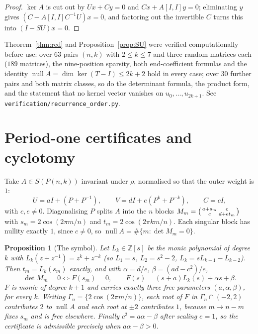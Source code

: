 \documentclass[11pt]{article}
\newtheorem{proposition}[theorem]{Proposition}
\theoremstyle{definition}
\begin{document}
\begin{proof}
$\ker A$ is cut out by $Ux+Cy=0$ and $Cx+A[I,I]y=0$; eliminating $y$ gives
$(C-A[I,I]C^{-1}U)x=0$, and factoring out the invertible $C$ turns this into
$(I-SU)x=0$.
\end{proof}

\noindent
Theorem~\ref{thm:red} and Proposition~\ref{prop:SU} were verified
computationally before use: over $63$ pairs $(n,k)$ with $2\le k\le7$ and
three random matrices each ($189$ matrices), the nine-position sparsity, both
end-coefficient formulas and the identity
$\operatorname{null}A=\dim\ker(T-I)\le 2k+2$ hold in every case; over $30$
further pairs and both matrix classes, so do the determinant formula, the
product form, and the statement that no kernel vector vanishes on
$u_0,\dots,u_{2k+1}$. See \texttt{verification/recurrence\_order.py}.

\section{Period-one certificates and cyclotomy}\label{sec:cyclo}
Take $A\in S(P(n,k))$ invariant under $\rho$, normalised so that the outer
weight is $1$:
\[
  U=aI+(P+P^{-1}),\qquad V=dI+e(P^{k}+P^{-k}),\qquad C=cI,
\]
with $c,e\ne0$. Diagonalising $P$ splits $A$ into the $n$ blocks
$M_m=\begin{psmallmatrix}a+s_m&c\\ c&d+et_m\end{psmallmatrix}$ with
$s_m=2\cos(2\pi m/n)$ and $t_m=2\cos(2\pi km/n)$. Each singular block has
nullity exactly $1$, since $c\ne0$, so
$\operatorname{null}A=\#\{m: \det M_m=0\}$.

\begin{proposition}[The symbol]\label{prop:symbol}
Let $L_k\in\mathbb Z[s]$ be the monic polynomial of degree $k$ with
$L_k(z+z^{-1})=z^{k}+z^{-k}$ (so $L_1=s$, $L_2=s^2-2$,
$L_k=sL_{k-1}-L_{k-2}$). Then $t_m=L_k(s_m)$ exactly, and with
$\alpha=d/e$, $\beta=(ad-c^{2})/e$,
\[
  \det M_m=0\iff F(s_m)=0,\qquad
  F(s)=(s+a)L_k(s)+\alpha s+\beta .
\]
$F$ is monic of degree $k+1$ and carries exactly three free parameters
$(a,\alpha,\beta)$, for every $k$. Writing
$\Gamma_n=\{2\cos(2\pi m/n)\}$, each root of $F$ in
$\Gamma_n\cap(-2,2)$ contributes $2$ to $\operatorname{null}A$ and each root
at $\pm2$ contributes $1$, because $m\mapsto n-m$ fixes $s_m$ and is free
elsewhere. Finally $c^{2}=a\alpha-\beta$ after scaling $e=1$, so the
certificate is admissible precisely when $a\alpha-\beta>0$.
\end{proposition}
\end{document}

